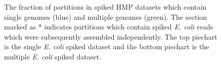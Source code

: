 \documentclass[11pt]{article} %
\begin{document}
\begin{figure}[h!]
\caption{The fraction of partitions in spiked HMP datasets which contain single genomes (blue) and multiple genomes (green).  The section marked as * indicates partitions which contain spiked \emph{E. coli} reads which were subsequently assembled independently.  The top piechart is the single \emph{E. coli} spiked dataset and the bottom piechart is the multiple \emph{E. coli} spiked dataset.}
\label{ecolimap}
\end{figure}
\end{document}
